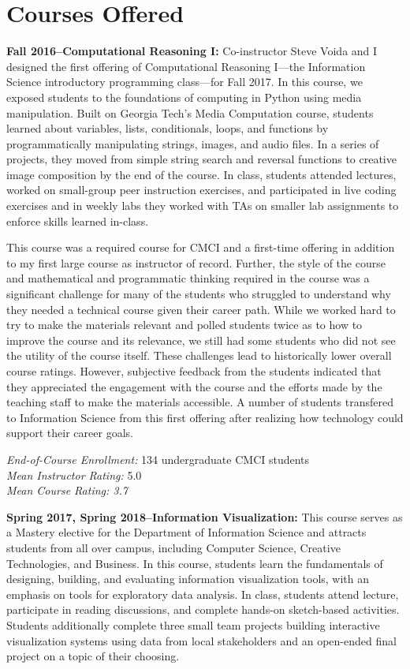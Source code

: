 \documentclass[11pt]{article}
\begin{document}
\section*{Courses Offered}

\textbf{Fall 2016--Computational Reasoning I: }
Co-instructor Steve Voida and I designed the first offering of Computational Reasoning I---the Information Science introductory programming class---for Fall 2017. In this course, we exposed students to the foundations of computing in Python using media manipulation. Built on Georgia Tech's Media Computation course, students learned about variables, lists, conditionals, loops, and functions by programmatically manipulating strings, images, and audio files. In a series of projects, they moved from simple string search and reversal functions to creative image composition by the end of the course. In class, students attended lectures, worked on small-group peer instruction exercises, and participated in live coding exercises and in weekly labs they worked with TAs on smaller lab assignments to enforce skills learned in-class.

This course was a required course for CMCI and a first-time offering in addition to my first large course as instructor of record. Further, the style of the course and mathematical and programmatic thinking required in the course was a significant challenge for many of the students who struggled to understand why they needed a technical course given their career path. While we worked hard to try to make the materials relevant and polled students twice as to how to improve the course and its relevance, we still had some students who did not see the utility of the course itself. These challenges lead to historically lower overall course ratings. However, subjective feedback from the students indicated that they appreciated the engagement with the course and the efforts made by the teaching staff to make the materials accessible. A number of students transfered to Information Science from this first offering after realizing how technology could support their career goals. 

\emph{End-of-Course Enrollment: }134 undergraduate CMCI students\\
\emph{Mean Instructor Rating:} 5.0\\
\emph{Mean Course Rating: 3.7} 

\textbf{Spring 2017, Spring 2018--Information Visualization: } 
This course serves as a Mastery elective for the Department of Information Science and attracts students from all over campus, including Computer Science, Creative Technologies, and Business. In this course, students learn the fundamentals of designing, building, and evaluating information visualization tools, with an emphasis on tools for exploratory data analysis. In class, students attend lecture, participate in reading discussions, and complete hands-on sketch-based activities. Students additionally complete three small team projects building interactive visualization systems using data from local stakeholders and an open-ended final project on a topic of their choosing. 
\end{document}
